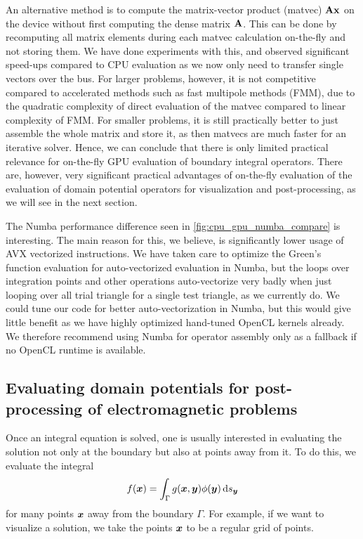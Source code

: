 An alternative method is to compute the matrix-vector product (matvec) $\mathbf{A}\mathbf{x}$ on the device without first computing the dense matrix $\mathbf{A}$. This can be done by recomputing all matrix elements during each matvec calculation on-the-fly and not storing them. We have done experiments with this, and observed significant speed-ups compared to CPU evaluation as we now only need to transfer single vectors over the bus. For larger problems, however, it is not competitive compared to accelerated methods such as fast multipole methods (FMM), due to the quadratic complexity of direct evaluation of the matvec compared to linear complexity of FMM. For smaller problems, it is still practically better to just assemble the whole matrix and store it, as then matvecs are much faster for an iterative solver. Hence, we can conclude that there is only limited practical relevance for on-the-fly GPU evaluation of boundary integral operators. There are, however, very significant practical advantages of on-the-fly evaluation of the evaluation of domain potential operators for visualization and post-processing, as we will see in the next section.

The Numba performance difference seen in \cref{fig:cpu_gpu_numba_compare} is interesting. The main reason for this, we believe, is significantly lower usage of AVX vectorized instructions. We have taken care to optimize the Green's function evaluation for auto-vectorized evaluation in Numba, but the loops over integration points and other operations auto-vectorize very badly when just looping over all trial triangle for a single test triangle, as we currently do. We could tune our code for better auto-vectorization in Numba, but this would give little benefit as we have highly optimized hand-tuned OpenCL kernels already. We therefore recommend using Numba for operator assembly only as a fallback if no OpenCL runtime is available.

\subsection{Evaluating domain potentials for post-processing of electromagnetic problems}
Once an integral equation is solved, one is usually interested in evaluating the solution not only at the boundary but also at points away from it. To do this, we evaluate the integral
$$
f(\bx) = \int_{\Gamma}g(\bx, \by)\phi(\by) \ds[\by]
$$
for many points $\boldsymbol{x}$ away from the boundary $\Gamma$. For example, if we want to visualize a solution, we take the points $\boldsymbol{x}$ to be a regular grid of points.

